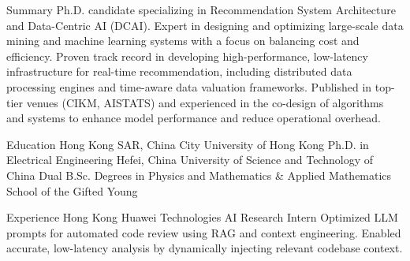 \documentclass[caps, english]{financecv}
\begin{document}
\begin{cvsection}{Summary}
    Ph.D. candidate specializing in Recommendation System Architecture and Data-Centric AI (DCAI). Expert in designing and optimizing large-scale data mining and machine learning systems with a focus on balancing cost and efficiency. Proven track record in developing high-performance, low-latency infrastructure for real-time recommendation, including distributed data processing engines and time-aware data valuation frameworks. Published in top-tier venues (CIKM, AISTATS) and experienced in the co-design of algorithms and systems to enhance model performance and reduce operational overhead.
\end{cvsection}

\begin{cvsection}{Education}
    {Hong Kong SAR, China}
    {City University of Hong Kong}
    {}
    {Ph.D. in Electrical Engineering}
    {}
    {}
    {}
    {Hefei, China}
    {University of Science and Technology of China}
    {}
    {Dual B.Sc. Degrees in Physics and Mathematics \& Applied Mathematics}
    {School of the Gifted Young}
    {}
    {}
\end{cvsection}

\begin{cvsection}{Experience}
    {Hong Kong}
    {Huawei Technologies}
    {AI Research Intern}
    {Optimized LLM prompts for automated code review using RAG and context engineering. Enabled accurate, low-latency analysis by dynamically injecting relevant codebase context.}
    {}
    {}
    {}
\end{cvsection}
\end{document}
